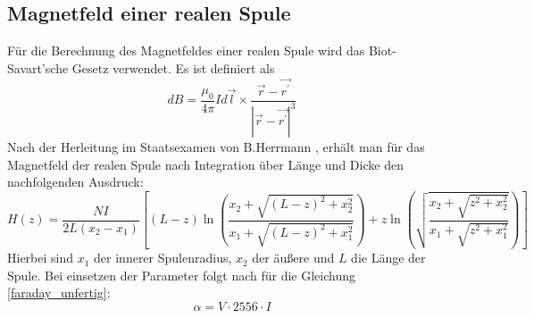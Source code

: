 \subsection{Magnetfeld einer realen Spule}
Für die Berechnung des Magnetfeldes einer realen Spule wird das Biot-Savart'sche Gesetz verwendet. Es ist definiert als 
\begin{equation}
\label{biot-savart}
d B = \frac{\mu_0}{4 \pi} I d \vec{l} \times \frac{\vec{r}-\vec{r^\prime}}{\left|\vec{r}-\vec{r^\prime}\right|^3}
\end{equation}
Nach der Herleitung im Staatsexamen von B.Herrmann \cite{staatsex_farpock}, erhält man für das Magnetfeld der realen Spule nach Integration über Länge und Dicke den nachfolgenden Ausdruck:
\begin{equation}\label{magnetfeld_real}
H(z) = \frac{N I}{2L(x_2-x_1)}\left[
(L-z) \ln\left(\frac{x_2 + \sqrt{(L-z)^2+x_2^2}}{x_1 + \sqrt{(L-z)^2+x_1^2}}\right) + z \ln \left(\sqrt{\frac{x_2 + \sqrt{z^2 +x_2^2}}{x_1 + \sqrt{z^2 +x_1^2}}}\right) 
\right]
\end{equation}
Hierbei sind $x_1$ der innerer Spulenradius, $x_2$ der äußere und $L$ die Länge der Spule. Bei einsetzen der Parameter folgt nach \cite{staatsex_farpock} für die Gleichung \ref{faraday_unfertig}: 
\begin{equation}\label{faraday}
\alpha = V \cdot 2556 \cdot I 
\end{equation}